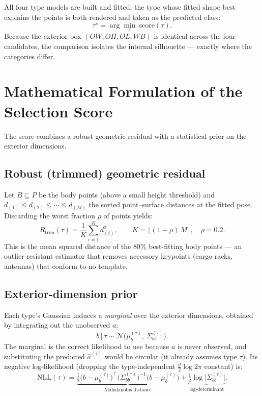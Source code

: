 \documentclass[11pt]{article}
\newcommand{\OL}{\mathit{OL}}
\newcommand{\OW}{\mathit{OW}}
\newcommand{\OH}{\mathit{OH}}
\newcommand{\WB}{\mathit{WB}}
\newcommand{\given}{\,\vert\,}
\newcommand{\Rtrim}{R_{\text{trim}}}
\newcommand{\NLL}{\text{NLL}}
\theoremstyle{definition}
\begin{document}
All four type models are built and fitted; the type whose fitted shape best explains the points is both rendered and taken as the predicted class:
\begin{equation}
\tau^\star = \arg\min_\tau\ \text{score}(\tau).
\label{eq:argmin}
\end{equation}
Because the exterior box $(\OW,\OH,\OL,\WB)$ is identical across the four candidates, the comparison isolates the internal silhouette --- exactly where the categories differ.

\section{Mathematical Formulation of the Selection Score}

The score combines a robust geometric residual with a statistical prior on the exterior dimensions.

\subsection{Robust (trimmed) geometric residual}

Let $B \subseteq P$ be the body points (above a small height threshold) and $d_{(1)} \le d_{(2)} \le \cdots \le d_{(M)}$ the sorted point--surface distances at the fitted pose. Discarding the worst fraction $\rho$ of points yields:
\begin{equation}
\Rtrim(\tau) = \frac{1}{K}\sum_{i=1}^{K} d_{(i)}^2, \qquad K = \big\lfloor (1-\rho)\,M \big\rfloor,\quad \rho = 0.2.
\label{eq:rtrim}
\end{equation}
This is the mean squared distance of the $80\%$ best-fitting body points --- an outlier-resistant estimator that removes accessory keypoints (cargo racks, antennas) that conform to no template.

\subsection{Exterior-dimension prior}

Each type's Gaussian induces a \emph{marginal} over the exterior dimensions, obtained by integrating out the unobserved $a$:
\begin{equation}
b \given \tau \sim \mathcal{N}\!\big(\mu_b^{(\tau)},\ \Sigma_{bb}^{(\tau)}\big).
\end{equation}
The marginal is the correct likelihood to use because $a$ is never observed, and substituting the predicted $\hat{a}^{(\tau)}$ would be circular (it already assumes type $\tau$). Its negative log-likelihood (dropping the type-independent $\tfrac{d}{2}\log 2\pi$ constant) is:
\begin{equation}
\NLL(\tau) = \underbrace{\tfrac{1}{2}\big(b-\mu_b^{(\tau)}\big)^{\top}\big(\Sigma_{bb}^{(\tau)}\big)^{-1}\big(b-\mu_b^{(\tau)}\big)}_{\text{Mahalanobis distance}}
+ \underbrace{\tfrac{1}{2}\log\big|\Sigma_{bb}^{(\tau)}\big|}_{\text{log-determinant}}.
\label{eq:nll}
\end{equation}
\end{document}
